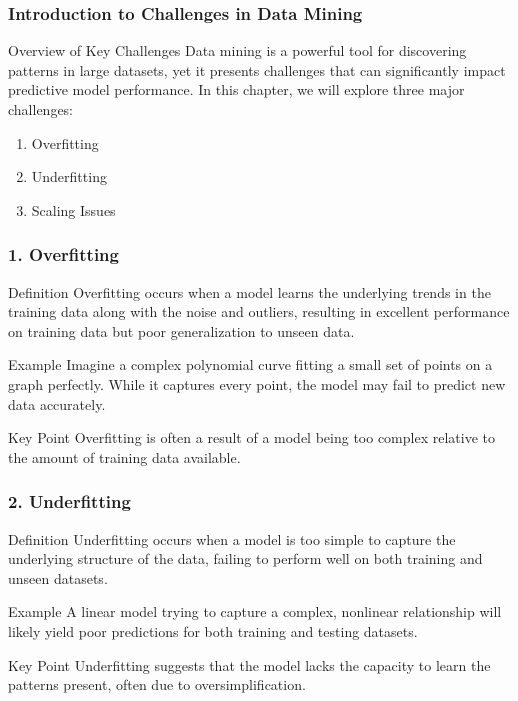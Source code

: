 \documentclass[aspectratio=169]{beamer}
\begin{document}
\frame{\titlepage}

\begin{frame}[fragile]
    \frametitle{Introduction to Challenges in Data Mining}
    \begin{block}{Overview of Key Challenges}
        Data mining is a powerful tool for discovering patterns in large datasets, yet it presents challenges that can significantly impact predictive model performance. In this chapter, we will explore three major challenges:
    \end{block}
    \begin{enumerate}
        \item Overfitting
        \item Underfitting
        \item Scaling Issues
    \end{enumerate}
\end{frame}

\begin{frame}[fragile]
    \frametitle{1. Overfitting}
    \begin{block}{Definition}
        Overfitting occurs when a model learns the underlying trends in the training data along with the noise and outliers, resulting in excellent performance on training data but poor generalization to unseen data.
    \end{block}
    \begin{block}{Example}
        Imagine a complex polynomial curve fitting a small set of points on a graph perfectly. While it captures every point, the model may fail to predict new data accurately.
    \end{block}
    \begin{block}{Key Point}
        Overfitting is often a result of a model being too complex relative to the amount of training data available.
    \end{block}
\end{frame}

\begin{frame}[fragile]
    \frametitle{2. Underfitting}
    \begin{block}{Definition}
        Underfitting occurs when a model is too simple to capture the underlying structure of the data, failing to perform well on both training and unseen datasets.
    \end{block}
    \begin{block}{Example}
        A linear model trying to capture a complex, nonlinear relationship will likely yield poor predictions for both training and testing datasets.
    \end{block}
    \begin{block}{Key Point}
        Underfitting suggests that the model lacks the capacity to learn the patterns present, often due to oversimplification.
    \end{block}
\end{frame}
\end{document}
